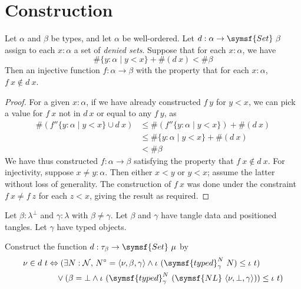 \section{Construction}

\begin{lemma}
    \label{lem:chooseWf}
    Let \( \alpha \) and \( \beta \) be types, and let \( \alpha \) be well-ordered.
    Let \( d : \alpha \to \symsf{Set}\ \beta \) assign to each \( x : \alpha \) a set of \emph{denied sets}.
    Suppose that for each \( x : \alpha \), we have
    \[ \#\{ y : \alpha \mid y < x \} + \#(d\ x) < \#\beta \]
    Then  an injective function \( f : \alpha \to \beta \) with the property that for each \( x : \alpha \), \( f\ x \not\in d\ x \).
\end{lemma}
\begin{proof}
    For a given \( x : \alpha \), if we have already constructed \( f\ y \) for \( y < x \), we can pick a value for \( f\ x \) not in \( d\ x \) or equal to any \( f\ y \), as
    \begin{align*}
        \#(f '' \{ y : \alpha \mid y < x \} \cup d\ x) &\leq \#(f '' \{ y : \alpha \mid y < x \}) + \#(d\ x) \\
        &\leq \#\{ y : \alpha \mid y < x \} + \#(d\ x) \\
        &< \#\beta
    \end{align*}
    We have thus constructed \( f : \alpha \to \beta \) satisfying the property that \( f\ x \not\in d\ x \).
    For injectivity, suppose \( x \neq y : \alpha \).
    Then either \( x < y \) or \( y < x \); assume the latter without loss of generality.
    The construction of \( f\ x \) was done under the constraint \( f\ x \neq f\ z \) for each \( z < x \), giving the result as required.
\end{proof}
Let \( \beta : \lambda^\bot \) and \( \gamma : \lambda \) with \( \beta \neq \gamma \).
Let \( \beta \) and \( \gamma \) have tangle data and positioned tangles.
Let \( \gamma \) have typed objects.
\begin{definition}
    \label{def:fuzz_deny}
    Construct the function \( d : \tau_\beta \to \symsf{Set}\ \mu \) by
    \begin{align*}
        \nu \in d\ t &\Leftrightarrow (\exists N : \mathcal N,\, N^\circ = \langle \nu, \beta, \gamma \rangle \wedge \iota\ (\symsf{typed}^N_\gamma\ N) \leq \iota\ t) \\
        &\quad\vee (\beta = \bot \wedge \iota\ (\symsf{typed}^N_\gamma\ (\symsf{NL}\ \langle \nu, \bot, \gamma \rangle)) \leq \iota\ t)
    \end{align*}
\end{definition}
